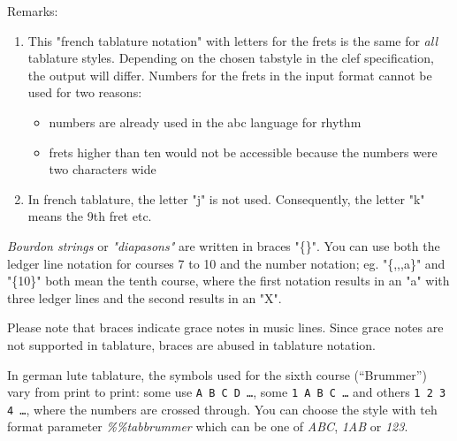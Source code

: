 \documentclass[a4paper]{article}
\begin{document}
Remarks:
\begin{enumerate}
\item This "french tablature notation" with letters for the 
frets is the same for {\it all} tablature styles. Depending on the
chosen tabstyle in the clef specification, the output will differ.
Numbers for the frets in the input format cannot be used for two reasons:
\begin{itemize}
\item numbers are already used in the abc language for rhythm
\item frets higher than ten would not be accessible because the numbers
were two characters wide
\end{itemize}
\item In french tablature, the letter "j" is not used. Consequently, 
the letter "k" means the 9th fret etc.
\end{enumerate}
 
{\it Bourdon strings} or {\it "diapasons"} are written in braces 
"\{\}". You can use both the ledger line notation for courses 7 to 10
and the number notation; eg. "\{,,,a\}" and "\{10\}" both mean
the tenth course, where the first notation results in an "a" with three
ledger lines and the second results in an "X".
\par
Please note that braces indicate grace notes in music lines. 
Since grace notes are not supported in tablature, braces are abused in 
tablature notation.
\par
{} 
In german lute tablature, the symbols used for the sixth course (``Brummer'')
vary from print to print: some use {\tt A B C D \ldots}, some 
{\tt 1 A B C \ldots} and others {\tt 1 2 3 4 \ldots}, where the numbers
are crossed through. You can choose the style with teh format parameter
{\it \%\%tabbrummer} which can be one of {\it ABC}, {\it 1AB} or {\it 123}.
\end{document}
